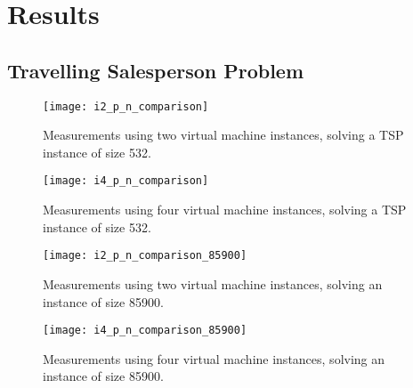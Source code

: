 \section{Results} \label{sec:results}


\subsection{Travelling Salesperson Problem}


\begin{figure}[htpb]
    \centering
    \begin{minipage}{.45\textwidth}
        \centering
        \texttt{[image: i2\_p\_n\_comparison]}
        \caption{Measurements using two virtual machine instances, solving
                 a TSP instance of size 532.}
        \label{fig:high-level}
    \end{minipage}%
    \hfill
    \begin{minipage}{.45\textwidth}
        \centering
        \texttt{[image: i4\_p\_n\_comparison]}
        \caption{Measurements using four virtual machine instances,
                 solving a TSP instance of size 532.}
        \label{fig:low-level}
    \end{minipage}%
    \label{fig:archs}
\end{figure}

\begin{figure}[htpb]
    \centering
    \begin{minipage}{.45\textwidth}
        \centering
        \texttt{[image: i2\_p\_n\_comparison\_85900]}
        \caption{Measurements using two virtual machine instances,
                 solving an instance of size 85900.}
        \label{fig:high-level}
    \end{minipage}%
    \hfill
    \begin{minipage}{.45\textwidth}
        \centering
        \texttt{[image: i4\_p\_n\_comparison\_85900]}
        \caption{Measurements using four virtual machine instances,
                 solving an instance of size 85900.}
        \label{fig:low-level}
    \end{minipage}%
    \label{fig:archs}
\end{figure}
